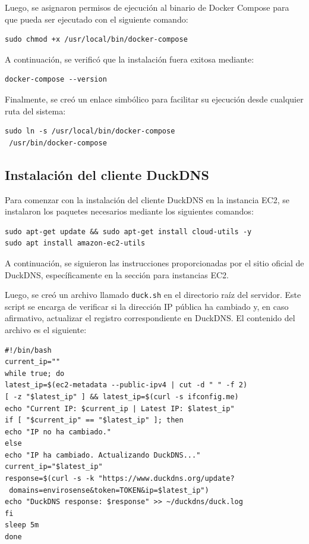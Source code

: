Luego, se asignaron permisos de ejecución al binario de Docker Compose para que
pueda ser ejecutado con el siguiente comando:

\begin{verbatim}
sudo chmod +x /usr/local/bin/docker-compose
\end{verbatim}

A continuación, se verificó que la instalación fuera exitosa mediante:

\begin{verbatim}
docker-compose --version
\end{verbatim}

Finalmente, se creó un enlace simbólico para facilitar su ejecución desde
cualquier ruta del sistema:

\begin{verbatim}
sudo ln -s /usr/local/bin/docker-compose 
 /usr/bin/docker-compose
\end{verbatim}

\subsection{Instalación del cliente DuckDNS}

Para comenzar con la instalación del cliente DuckDNS en la instancia EC2, se
instalaron los paquetes necesarios mediante los siguientes comandos:

\begin{verbatim}
sudo apt-get update && sudo apt-get install cloud-utils -y
sudo apt install amazon-ec2-utils
\end{verbatim}

A continuación, se siguieron las instrucciones proporcionadas por el sitio
oficial de DuckDNS, específicamente en la sección para instancias EC2.

Luego, se creó un archivo llamado \texttt{duck.sh} en el directorio raíz del
servidor. Este script se encarga de verificar si la dirección IP pública ha
cambiado y, en caso afirmativo, actualizar el registro correspondiente en
DuckDNS. El contenido del archivo es el siguiente:

\begin{verbatim}
#!/bin/bash
current_ip=""
while true; do
latest_ip=$(ec2-metadata --public-ipv4 | cut -d " " -f 2)
[ -z "$latest_ip" ] && latest_ip=$(curl -s ifconfig.me)
echo "Current IP: $current_ip | Latest IP: $latest_ip"
if [ "$current_ip" == "$latest_ip" ]; then
echo "IP no ha cambiado."
else
echo "IP ha cambiado. Actualizando DuckDNS..."
current_ip="$latest_ip"
response=$(curl -s -k "https://www.duckdns.org/update?
 domains=envirosense&token=TOKEN&ip=$latest_ip")
echo "DuckDNS response: $response" >> ~/duckdns/duck.log
fi
sleep 5m
done
\end{verbatim}

